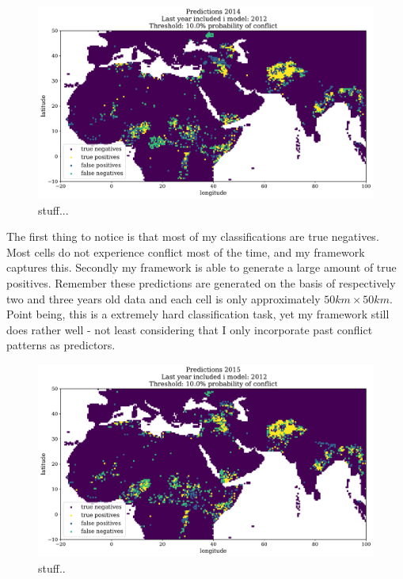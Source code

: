 \documentclass[a4paper]{article}
\begin{document}
\begin{figure}[!htb]
	\centering
	\includegraphics[scale=0.47]{confusion_map_2014.pdf}
    \caption{\footnotesize{stuff...}}\label{confusion_map_2014}
\end{figure}

The first thing to notice is that most of my classifications are true negatives. Most cells do not experience conflict most of the time, and my framework captures this. Secondly my framework is able to generate a large amount of true positives. Remember these predictions are generated on the basis of respectively two and three years old data and each cell is only approximately $50km\times50km$. Point being, this is a extremely hard classification task, yet my framework still does rather well - not least considering that I only incorporate past conflict patterns as predictors.\par

\begin{figure}[!htb]
	\centering
	\includegraphics[scale=0.47]{confusion_map_2015.pdf}
    \caption{\footnotesize{stuff..}}\label{confusion_map_2015}
\end{figure}
\end{document}
